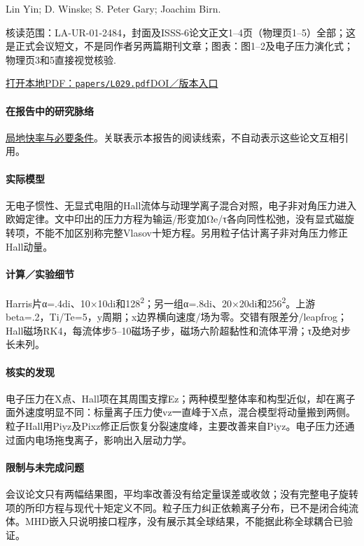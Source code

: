 Lin Yin;  D. Winske;  S. Peter Gary;  Joachim Birn.

\textsf{核读范围：}LA-UR-01-2484，封面及ISSS-6论文正文1–4页（物理页1–5）全部；这是正式会议短文，不是同作者另两篇期刊文章；\textsf{图表：}图1–2及电子压力演化式；物理页3和5直接视觉核验.

\href{run:papers/L029.pdf}{打开本地PDF：\texttt{papers/L029.pdf}}\quad\href{https://digital.library.unt.edu/ark:/67531/metadc718188/}{DOI／版本入口}

\paragraph{在报告中的研究脉络}\hyperref[story:fast]{局地快率与必要条件}。关联表示本报告的阅读线索，不自动表示这些论文互相引用。

\paragraph{实际模型}无电子惯性、无显式电阻的Hall流体与动理学离子混合对照，电子非对角压力进入欧姆定律。文中印出的压力方程为输运/形变加Ωe/τ各向同性松弛，没有显式磁旋转项，不能不加区别称完整Vlasov十矩方程。另用粒子估计离子非对角压力修正Hall动量。

\paragraph{计算／实验细节}Harris片α=.4di、10×10di和128\textsuperscript{2}；另一组α=.8di、20×20di和256\textsuperscript{2}。上游beta=.2，Ti/Te=5，y周期；x边界横向速度/场为零。交错有限差分/leapfrog；Hall磁场RK4，每流体步5–10磁场子步，磁场六阶超黏性和流体平滑；τ及绝对步长未列。

\paragraph{核实的发现}电子压力在X点、Hall项在其周围支撑Ez；两种模型整体率和构型近似，却在离子面外速度明显不同：标量离子压力使vz一直峰于X点，混合模型将动量搬到两侧。粒子Hall用Piyz及Pixz修正后恢复分裂速度峰，主要改善来自Piyz。电子压力还通过面内电场拖曳离子，影响出入层动力学。

\paragraph{限制与未完成问题}会议论文只有两幅结果图，平均率改善没有给定量误差或收敛；没有完整电子旋转项的所印方程与现代十矩定义不同。粒子压力纠正依赖离子分布，已不是闭合纯流体。MHD嵌入只说明接口程序，没有展示其全球结果，不能据此称全球耦合已验证。

